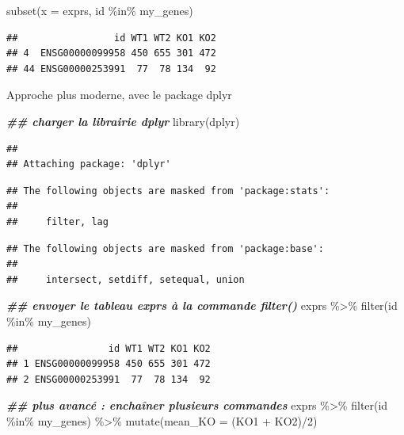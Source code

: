\documentclass[
]{book}
\newenvironment{Shaded}{\begin{snugshade}}{\end{snugshade}}
\newcommand{\AttributeTok}[1]{\textcolor[rgb]{0.77,0.63,0.00}{#1}}
\newcommand{\DecValTok}[1]{\textcolor[rgb]{0.00,0.00,0.81}{#1}}
\newcommand{\DocumentationTok}[1]{\textcolor[rgb]{0.56,0.35,0.01}{\textbf{\textit{#1}}}}
\newcommand{\FunctionTok}[1]{\textcolor[rgb]{0.00,0.00,0.00}{#1}}
\newcommand{\NormalTok}[1]{#1}
\newcommand{\SpecialCharTok}[1]{\textcolor[rgb]{0.00,0.00,0.00}{#1}}
\begin{document}
\begin{Shaded}
\begin{Highlighting}[]
\FunctionTok{subset}\NormalTok{(}\AttributeTok{x =}\NormalTok{ exprs, id }\SpecialCharTok{\%in\%}\NormalTok{ my\_genes)     }
\end{Highlighting}
\end{Shaded}

\begin{verbatim}
##                 id WT1 WT2 KO1 KO2
## 4  ENSG00000099958 450 655 301 472
## 44 ENSG00000253991  77  78 134  92
\end{verbatim}

Approche plus moderne, avec le package dplyr

\begin{Shaded}
\begin{Highlighting}[]
\DocumentationTok{\#\# charger la librairie dplyr}
\FunctionTok{library}\NormalTok{(dplyr)  }
\end{Highlighting}
\end{Shaded}

\begin{verbatim}
## 
## Attaching package: 'dplyr'
\end{verbatim}

\begin{verbatim}
## The following objects are masked from 'package:stats':
## 
##     filter, lag
\end{verbatim}

\begin{verbatim}
## The following objects are masked from 'package:base':
## 
##     intersect, setdiff, setequal, union
\end{verbatim}

\begin{Shaded}
\begin{Highlighting}[]
\DocumentationTok{\#\# envoyer le tableau exprs à la commande filter()}
\NormalTok{exprs }\SpecialCharTok{\%\textgreater{}\%} \FunctionTok{filter}\NormalTok{(id }\SpecialCharTok{\%in\%}\NormalTok{ my\_genes)  }
\end{Highlighting}
\end{Shaded}

\begin{verbatim}
##                id WT1 WT2 KO1 KO2
## 1 ENSG00000099958 450 655 301 472
## 2 ENSG00000253991  77  78 134  92
\end{verbatim}

\begin{Shaded}
\begin{Highlighting}[]
\DocumentationTok{\#\# plus avancé : enchaîner plusieurs commandes}
\NormalTok{exprs }\SpecialCharTok{\%\textgreater{}\%} 
  \FunctionTok{filter}\NormalTok{(id }\SpecialCharTok{\%in\%}\NormalTok{ my\_genes) }\SpecialCharTok{\%\textgreater{}\%} 
  \FunctionTok{mutate}\NormalTok{(}\AttributeTok{mean\_KO =}\NormalTok{ (KO1 }\SpecialCharTok{+}\NormalTok{ KO2)}\SpecialCharTok{/}\DecValTok{2}\NormalTok{)   }
\end{Highlighting}
\end{Shaded}
\end{document}
